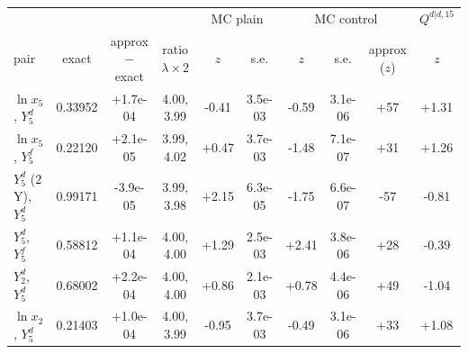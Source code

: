 \begin{tabular}{lccccccccc}
\toprule
 & & & & \multicolumn{2}{c}{MC plain} & \multicolumn{3}{c}{MC control} & $Q^{d|d,15}$ \\
\cmidrule(lr){5-6}\cmidrule(lr){7-9}\cmidrule(lr){10-10}
pair & exact & approx $-$ exact & ratio $\lambda\times2$ & $z$ & s.e. & $z$ & s.e. & approx ($z$) & $z$ \\
\midrule
$\ln x_5$, $Y^d_5$ & 0.33952 & +1.7e-04 & 4.00, 3.99 & -0.41 & 3.5e-03 & -0.59 & 3.1e-06 & +57 & +1.31 \\
$\ln x_5$, $Y^f_5$ & 0.22120 & +2.1e-05 & 3.99, 4.02 & +0.47 & 3.7e-03 & -1.48 & 7.1e-07 & +31 & +1.26 \\
$Y^d_5$ ($2$Y), $Y^d_5$ & 0.99171 & -3.9e-05 & 3.99, 3.98 & +2.15 & 6.3e-05 & -1.75 & 6.6e-07 & -57 & -0.81 \\
$Y^d_5$, $Y^f_5$ & 0.58812 & +1.1e-04 & 4.00, 4.00 & +1.29 & 2.5e-03 & +2.41 & 3.8e-06 & +28 & -0.39 \\
$Y^d_2$, $Y^d_5$ & 0.68002 & +2.2e-04 & 4.00, 4.00 & +0.86 & 2.1e-03 & +0.78 & 4.4e-06 & +49 & -1.04 \\
$\ln x_2$, $Y^d_5$ & 0.21403 & +1.0e-04 & 4.00, 3.99 & -0.95 & 3.7e-03 & -0.49 & 3.1e-06 & +33 & +1.08 \\
\bottomrule
\end{tabular}